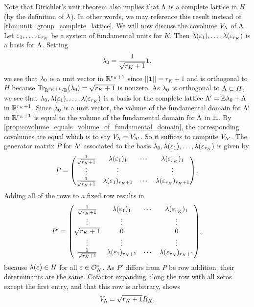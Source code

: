     Note that Dirichlet's unit theorem also implies that $\Lambda$ is a complete lattice in $H$ (by the definition of $\lambda$). In other words, we may reference this result instead of \cref{thm:unit_group_complete_lattice}. We will now discuss the covolume $V_{\Lambda}$ of $\Lambda$. Let $\varepsilon_{1},\ldots,\varepsilon_{r_{K}}$ be a system of fundamental units for $K$. Then $\lambda(\varepsilon_{1}),\ldots,\lambda(\varepsilon_{r_{K}})$ is a basis for $\Lambda$. Setting
    \[
      \lambda_{0} = \frac{1}{\sqrt{r_{K}+1}}\mathbf{1},
    \]
    we see that $\lambda_{0}$ is a unit vector in $\mathbb{R}^{r_{K}+1}$ since $||\mathbf{1}|| = r_{K}+1$ and is orthogonal to $H$ because $\operatorname{\mathrm{Tr}}_{\mathbb{R}^{r_{K}+1}/\mathbb{R}}(\lambda_{0}) = \sqrt{r_{K}+1}$ is nonzero. As $\lambda_{0}$ is orthogonal to $\Lambda \subset H$, we see that $\lambda_{0},\lambda(\varepsilon_{1}),\ldots,\lambda(\varepsilon_{r_{K}})$ is a basis for the complete lattice $\Lambda' = \mathbb{Z}\lambda_{0}+\Lambda$ in $\mathbb{R}^{r_{K}+1}$. Since $\lambda_{0}$ is a unit vector, the volume of the fundamental domain for $\Lambda'$ in $\mathbb{R}^{r_{K}+1}$ is equal to the volume of the fundamental domain for $\Lambda$ in $\mathbb{H}$. By \cref{prop:covolume_equals_volume_of_fundamental_domain}, the corresponding covolumes are equal which is to say $V_{\Lambda} = V_{\Lambda'}$. So it suffices to compute $V_{\Lambda'}$. The generator matrix $P$ for $\Lambda'$ associated to the basis $\lambda_{0},\lambda(\varepsilon_{1}),\ldots,\lambda(\varepsilon_{r_{K}})$ is given by
    \[
      P = \begin{pmatrix} \frac{1}{\sqrt{r_{K}+1}} & \lambda(\varepsilon_{1})_{1} & \cdots & \lambda(\varepsilon_{r_{K}})_{1} \\ \vdots & \vdots & & \vdots \\ \frac{1}{\sqrt{r_{K}+1}} & \lambda(\varepsilon_{1})_{r_{K}+1} & \cdots & \lambda(\varepsilon_{r_{K}})_{r_{K}+1} \end{pmatrix}.
    \]
    Adding all of the rows to a fixed row results in
    \[
      P' = \begin{pmatrix} \frac{1}{\sqrt{r_{K}+1}} & \lambda(\varepsilon_{1})_{1} & \cdots & \lambda(\varepsilon_{r_{K}})_{1} \\ \vdots & \vdots & & \vdots \\ \sqrt{r_{K}+1} & 0 & & 0 \\ \vdots & \vdots & & \vdots \\ \frac{1}{\sqrt{r_{K}+1}} & \lambda(\varepsilon_{1})_{r_{K}+1} & \cdots & \lambda(\varepsilon_{r_{K}})_{r_{K}+1} \end{pmatrix},
    \]
    because $\lambda(\varepsilon) \in H$ for all $\varepsilon \in \mathcal{O}_{K}^{\ast}$. As $P'$ differs from $P$ be row addition, their determinants are the same. Cofactor expanding along the row with all zeros except the first entry, and that this row is arbitrary, shows
    \begin{equation}\label{equ:covolume_of_unit_lattice}
      V_{\Lambda} = \sqrt{r_{K}+1}R_{K},
    \end{equation}
